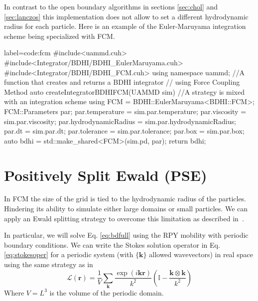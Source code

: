 \documentclass[twoside,openright,titlepage,numbers=noenddot,%
headinclude,footinclude,cleardoublepage=empty,abstract=on,
BCOR=5mm,fontsize=11pt, dvipsnames, paper=b5
]{scrreprt}
\renewcommand{\vec}[1]{\bm{#1}}
\newcommand{\oper}[1]{\mathcal{#1}}
\newcommand{\fpos}{r}
\begin{document}
In contrast to the open boundary algorithms in sections \ref{sec:chol} and \ref{sec:lanczos} this implementation does not allow to set a different hydrodynamic radius for each particle.
Here is an example of the Euler-Maruyama integration scheme being specialized with \gls{FCM}.
\begin{code2} {label=code:fcm}
#include<uammd.cuh>
#include<Integrator/BDHI/BDHI_EulerMaruyama.cuh>
#include<Integrator/BDHI/BDHI_FCM.cuh>
using namespace uammd;
//A function that creates and returns a BDHI integrator
// using Force Coupling Method
auto createIntegratorBDHIFCM(UAMMD sim){   
  //A strategy is mixed with an integration scheme
  using FCM = BDHI::EulerMaruyama<BDHI::FCM>;
  FCM::Parameters par;
  par.temperature = sim.par.temperature;
  par.viscosity = sim.par.viscosity;
  par.hydrodynamicRadius = sim.par.hydrodynamicRadius;
  par.dt = sim.par.dt;
  par.tolerance = sim.par.tolerance;
  par.box = sim.par.box;
  auto bdhi = std::make_shared<FCM>(sim.pd, par);
  return bdhi;
}
\end{code2}

\newpage

\section{Positively Split Ewald (PSE)}\label{sec:pse}
In \gls{FCM} the size of the grid is tied to the hydrodynamic radius of the particles. Hindering its ability to simulate either large domains or small particles.
We can apply an Ewald splitting strategy to overcome this limitation as described in~\cite{Fiore2017}.

In particular, we will solve Eq. \eqref{eq:bdfull} using the \gls{RPY} mobility with periodic boundary conditions. We can write the Stokes solution operator in Eq. \eqref{eq:stokesoper} for a periodic system (with $\{\vec{k}\}$ allowed wavevectors) in real space using the same strategy as in~\cite{Hasimoto1959}
\begin{equation}
  \label{eq:psestokesoper}
  \oper{L}(\vec{\fpos}) = \frac{1}{V}\sum_{\vec{k}} \frac{\exp(i\vec{k}\vec{r})}{k^2}\left(\mathbb{I} - \frac{\vec{k}\otimes\vec{k}}{k^2}\right)
\end{equation}
Where $V = L^3$ is the volume of the periodic domain.
\end{document}
